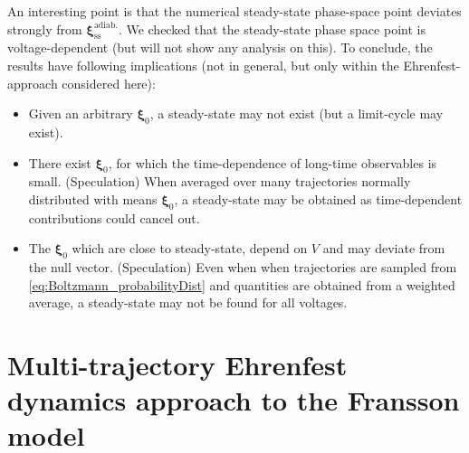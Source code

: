 \documentclass{article}
\begin{document}
An interesting point is that the numerical steady-state phase-space point deviates strongly from $\bm{\xi}^\mathrm{adiab.}_\mathrm{ss}$.
We checked that the steady-state phase space point is voltage-dependent (but will not show any analysis on this). 
To conclude, the results have following implications (not in general, but only within the Ehrenfest-approach considered here):
\begin{itemize}
	\item Given an arbitrary $\bm{\xi}_0$, a steady-state may not exist (but a limit-cycle may exist).
	\item There exist $\bm{\xi}_0$, for which the time-dependence of long-time observables is small. (Speculation) When averaged over many trajectories normally distributed with means $\bm{\xi}_0$, a steady-state may be obtained as time-dependent contributions could cancel out.
	\item The $\bm{\xi}_0$ which are close to steady-state, depend on $V$ and may deviate from the null vector. (Speculation) Even when when trajectories are sampled from \cref{eq:Boltzmann_probabilityDist} and quantities are obtained from a weighted average, a steady-state may not be found for all voltages.
\end{itemize} 
\newpage
\section{Multi-trajectory Ehrenfest dynamics approach to the Fransson model}
\end{document}
